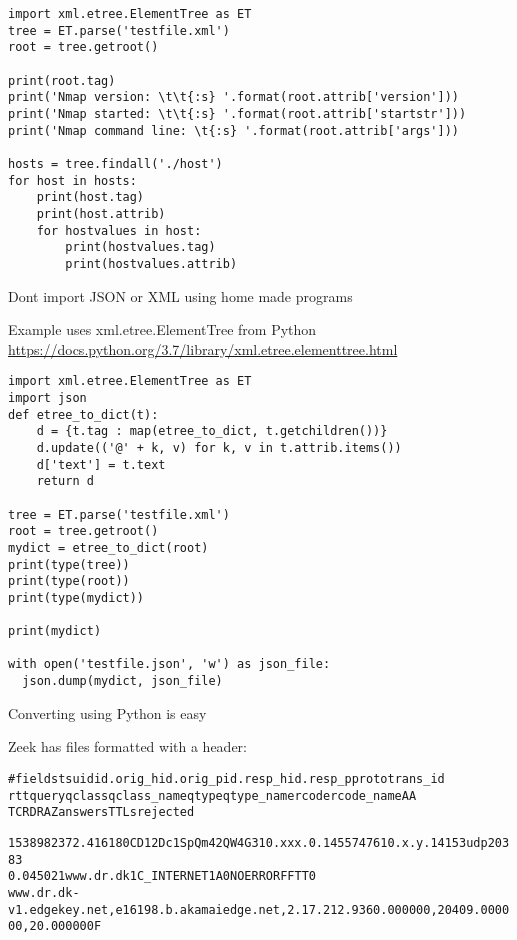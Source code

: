 \documentclass[Screen16to9,17pt]{foils}
\begin{document}

\begin{verbatim}
import xml.etree.ElementTree as ET
tree = ET.parse('testfile.xml')
root = tree.getroot()

print(root.tag)
print('Nmap version: \t\t{:s} '.format(root.attrib['version']))
print('Nmap started: \t\t{:s} '.format(root.attrib['startstr']))
print('Nmap command line: \t{:s} '.format(root.attrib['args']))

hosts = tree.findall('./host')
for host in hosts:
    print(host.tag)
    print(host.attrib)
    for hostvalues in host:
        print(hostvalues.tag)
        print(hostvalues.attrib)
\end{verbatim}

\begin{list2}
\item Dont import JSON or XML using home made programs
\item Example uses xml.etree.ElementTree from Python \url{https://docs.python.org/3.7/library/xml.etree.elementtree.html}
\end{list2}


\begin{verbatim}
import xml.etree.ElementTree as ET
import json
def etree_to_dict(t):
    d = {t.tag : map(etree_to_dict, t.getchildren())}
    d.update(('@' + k, v) for k, v in t.attrib.items())
    d['text'] = t.text
    return d

tree = ET.parse('testfile.xml')
root = tree.getroot()
mydict = etree_to_dict(root)
print(type(tree))
print(type(root))
print(type(mydict))

print(mydict)

with open('testfile.json', 'w') as json_file:
  json.dump(mydict, json_file)
\end{verbatim}

Converting using Python is easy




Zeek has files formatted with a header:
\begin{alltt}\footnotesize
#fields ts      uid     id.orig_h       id.orig_p       id.resp_h       id.resp_p       proto   trans_id
        rtt     query   qclass  qclass_name     qtype   qtype_name      rcode   rcode_name      AA
        TC      RD      RA      Z       answers TTLs    rejected

1538982372.416180	CD12Dc1SpQm42QW4G3	10.xxx.0.145	57476	10.x.y.141	53	udp	20383
	0.045021	www.dr.dk	1	C_INTERNET	1	A	0	NOERROR	F	F	T	T	0
   www.dr.dk-v1.edgekey.net,e16198.b.akamaiedge.net,2.17.212.93	60.000000,20409.000000,20.000000	F
\end{alltt}
\end{document}
